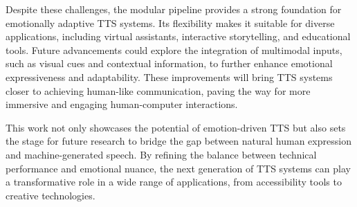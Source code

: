 Despite these challenges, the modular pipeline provides a strong foundation for emotionally adaptive TTS systems. Its flexibility makes it suitable for diverse applications, including virtual assistants, interactive storytelling, and educational tools. Future advancements could explore the integration of multimodal inputs, such as visual cues and contextual information, to further enhance emotional expressiveness and adaptability. These improvements will bring TTS systems closer to achieving human-like communication, paving the way for more immersive and engaging human-computer interactions.

This work not only showcases the potential of emotion-driven TTS but also sets the stage for future research to bridge the gap between natural human expression and machine-generated speech. By refining the balance between technical performance and emotional nuance, the next generation of TTS systems can play a transformative role in a wide range of applications, from accessibility tools to creative technologies.
